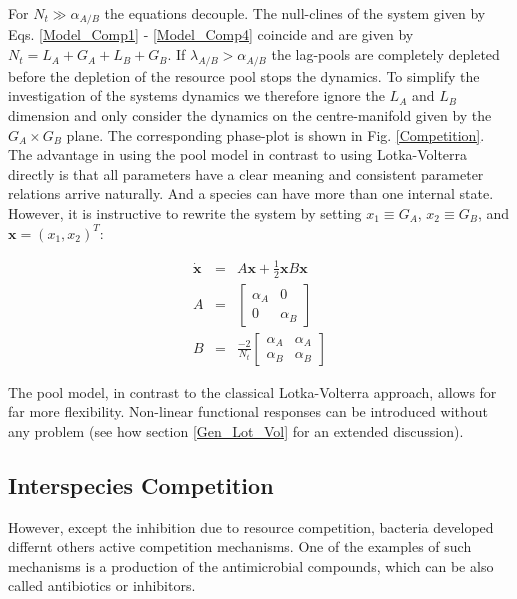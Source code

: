 \documentclass[10pt,A4paper]{article}
\begin{document}
For $N_t\gg\alpha_{A/B}$ the equations decouple. 
The null-clines of the system given by Eqs. \ref{Model_Comp1} - \ref{Model_Comp4} coincide and are given by $N_t=L_A+G_A+L_B+G_B$. 
If $\lambda_{A/B}>\alpha_{A/B}$ the lag-pools are completely depleted before the depletion of the resource pool stops the dynamics. 
To simplify the investigation of the systems dynamics we therefore ignore the $L_A$ and $L_B$ dimension and only consider the dynamics on the centre-manifold given by the $G_A\times G_B$ plane. 
The corresponding phase-plot is shown in Fig. \ref{Competition}. 
The advantage in using the pool model in contrast to using Lotka-Volterra directly is that all parameters have a clear meaning and consistent parameter relations arrive naturally. 
And a species can have more than one internal state. 
However, it is instructive to rewrite the system by setting $x_1\equiv G_A$, $x_2\equiv G_B$, and $\mathbf{x}=(x_1,x_2)^T$:

\begin{eqnarray}
\dot{\mathbf{x}}&=&A\mathbf{x}+\frac{1}{2}\mathbf{x}B\mathbf{x}\\
A&=&
\begin{bmatrix}
\alpha_A&0\\
0 &\alpha_B
\end{bmatrix}\\
B&=&
\frac{-2}{N_t}\begin{bmatrix}
\alpha_A&\alpha_A\\
\alpha_B &\alpha_B
\end{bmatrix}
\end{eqnarray}

The pool model, in contrast to the classical Lotka-Volterra approach, allows for far more flexibility. 
Non-linear functional responses can be introduced without any problem (see how section \ref{Gen_Lot_Vol} for an extended discussion).



\subsection{Interspecies Competition}

However, except the inhibition due to resource competition, bacteria developed differnt others active competition mechanisms.
One of the examples of such mechanisms is a production of the antimicrobial compounds, which can be also called antibiotics or inhibitors. 
\end{document}
